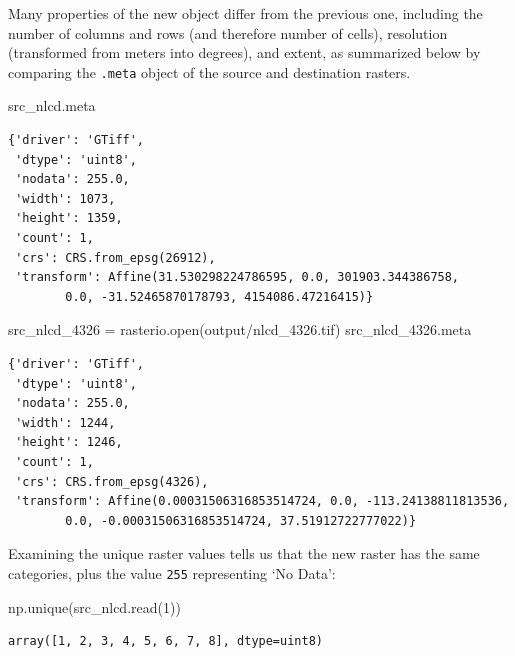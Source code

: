 \documentclass[
  letterpaper,
]{krantz}
\newenvironment{Shaded}{\begin{snugshade}}{\end{snugshade}}
\newcommand{\BuiltInTok}[1]{\textcolor[rgb]{0.00,0.23,0.31}{#1}}
\newcommand{\DecValTok}[1]{\textcolor[rgb]{0.68,0.00,0.00}{#1}}
\newcommand{\NormalTok}[1]{\textcolor[rgb]{0.00,0.23,0.31}{#1}}
\newcommand{\OperatorTok}[1]{\textcolor[rgb]{0.37,0.37,0.37}{#1}}
\newcommand{\StringTok}[1]{\textcolor[rgb]{0.13,0.47,0.30}{#1}}
\begin{document}
Many properties of the new object differ from the previous one,
including the number of columns and rows (and therefore number of
cells), resolution (transformed from meters into degrees), and extent,
as summarized below by comparing the \texttt{.meta} object of the source
and destination rasters.

\begin{Shaded}
\begin{Highlighting}[]
\NormalTok{src\_nlcd.meta}
\end{Highlighting}
\end{Shaded}

\begin{verbatim}
{'driver': 'GTiff',
 'dtype': 'uint8',
 'nodata': 255.0,
 'width': 1073,
 'height': 1359,
 'count': 1,
 'crs': CRS.from_epsg(26912),
 'transform': Affine(31.530298224786595, 0.0, 301903.344386758,
        0.0, -31.52465870178793, 4154086.47216415)}
\end{verbatim}

\begin{Shaded}
\begin{Highlighting}[]
\NormalTok{src\_nlcd\_4326 }\OperatorTok{=}\NormalTok{ rasterio.}\BuiltInTok{open}\NormalTok{(}\StringTok{\textquotesingle{}output/nlcd\_4326.tif\textquotesingle{}}\NormalTok{)}
\NormalTok{src\_nlcd\_4326.meta}
\end{Highlighting}
\end{Shaded}

\begin{verbatim}
{'driver': 'GTiff',
 'dtype': 'uint8',
 'nodata': 255.0,
 'width': 1244,
 'height': 1246,
 'count': 1,
 'crs': CRS.from_epsg(4326),
 'transform': Affine(0.00031506316853514724, 0.0, -113.24138811813536,
        0.0, -0.00031506316853514724, 37.51912722777022)}
\end{verbatim}

Examining the unique raster values tells us that the new raster has the
same categories, plus the value \texttt{255} representing `No Data':

\begin{Shaded}
\begin{Highlighting}[]
\NormalTok{np.unique(src\_nlcd.read(}\DecValTok{1}\NormalTok{))}
\end{Highlighting}
\end{Shaded}

\begin{verbatim}
array([1, 2, 3, 4, 5, 6, 7, 8], dtype=uint8)
\end{verbatim}
\end{document}
